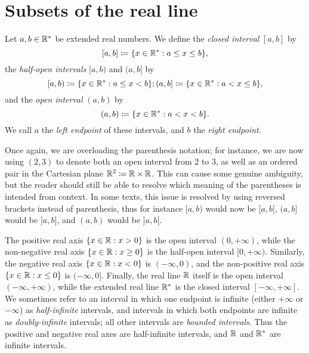 \section{Subsets of the real line}\label{sec:9.1}

\begin{defn}[Intervals]\label{9.1.1}
  Let \(a, b \in \mathbb{R}^*\) be extended real numbers.
  We define the \emph{closed interval} \([a, b]\) by
  \[
    [a, b] \coloneqq \{x \in \mathbb{R}^* : a \leq x \leq b\},
  \]
  the \emph{half-open intervals} \([a, b)\) and \((a, b]\) by
  \[
    [a, b) \coloneqq \{x \in \mathbb{R}^* : a \leq x < b\}; (a, b] \coloneqq \{x \in \mathbb{R}^* : a < x \leq b\},
  \]
  and the \emph{open interval} \((a, b)\) by
  \[
    (a, b) \coloneqq \{x \in \mathbb{R}^* : a < x < b\}.
  \]
  We call \(a\) the \emph{left endpoint} of these intervals, and \(b\) the \emph{right endpoint}.
\end{defn}

\begin{rmk}\label{9.1.2}
  Once again, we are overloading the parenthesis notation;
  for instance, we are now using \((2, 3)\) to denote both an open interval from \(2\) to \(3\), as well as an ordered pair in the Cartesian plane \(\mathbb{R}^2 \coloneqq \mathbb{R} \times \mathbb{R}\).
  This can cause some genuine ambiguity, but the reader should still be able to resolve which meaning of the parentheses is intended from context.
  In some texts, this issue is resolved by using reversed brackets instead of parenthesis, thus for instance \([a, b)\) would now be \([a, b[\), \((a, b]\) would be \(]a, b]\), and \((a, b)\) would be \(]a, b[\).
\end{rmk}

\begin{eg}\label{9.1.3}
  The positive real axis \(\{x \in \mathbb{R} : x > 0\}\) is the open interval \((0, +\infty)\), while the non-negative real axis \(\{x \in \mathbb{R} : x \geq 0\}\) is the half-open interval \([0, +\infty)\).
      Similarly, the negative real axis \(\{x \in \mathbb{R} : x < 0\}\) is \((-\infty, 0)\), and the non-positive real axis \(\{x \in \mathbb{R} : x \leq 0\}\) is \((-\infty, 0]\).
  Finally, the real line \(\mathbb{R}\) itself is the open interval \((-\infty, +\infty)\), while the extended real line \(\mathbb{R}^*\) is the closed interval \([-\infty, +\infty]\).
  We sometimes refer to an interval in which one endpoint is infinite (either \(+\infty\) or \(-\infty\)) as \emph{half-infinite} intervals, and intervals in which both endpoints are infinite as \emph{doubly-infinite} intervals;
  all other intervals are \emph{bounded intervals}.
  Thus the positive and negative real axes are half-infinite intervals, and \(\mathbb{R}\) and \(\mathbb{R}^*\) are infinite intervals.
\end{eg}

